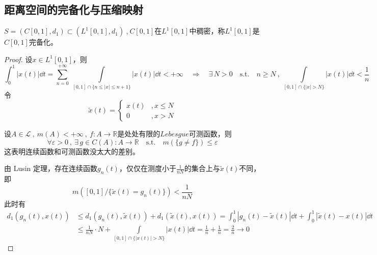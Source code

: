 \subsection{距离空间的完备化与压缩映射} \label{zip}
\begin{example}\label{example:l1complete}
\quad $S=(C[0,1],d_1) \subset (L^1[0,1],d_1) \ $,$ \ C[0,1]$在$L^1[0,1]$中稠密，称$L^1[0,1]$是$C[0,1]$完备化。
\end{example}
\begin{proof}
设$x \in L^1[0,1]$，则
\[\int_0^1|x(t)|\dd t=\sum_{n=0}^{+\infty} \ \int\limits_{[0,1]\cap\{n \leq |x| \leq n+1\}}|x(t)|\dd t<+\infty \quad \Rightarrow \quad \exists \, N>0 \quad \text{s.t.} \quad n \geq N \ , \ \int\limits_{[0,1]\cap\{|x|>N\}}|x(t)|\dd t<\frac{1}{n}\]
令
\[\tilde{x}(t)=\left \{
\begin{array}{ll}
    x(t) & , x \leq N \\ 0 & , x>N
\end{array}    
\right .\]
\begin{theorem}[Lusin 定理]\label{theorem:lusin}
设$A \in \mathscr{L} \ , \ m(A)<+\infty \ , \ f:A \to \mathbb{R}$是处处有限的$Lebesgue$可测函数，则
\[\forall \varepsilon>0 \ , \ \exists \, g \in C(A):A\to \mathbb{R} \quad \text{s.t.} \quad m(\{g \neq f\}) \leq \varepsilon\]
这表明连续函数和可测函数没太大的差别。
\end{theorem}
由 Lusin 定理，存在连续函数$g_n(t)$，仅仅在测度小于$\frac{1}{nN}$的集合上与$\tilde{x}(t)$不同，即
\[m([0,1]/\{\tilde{x}(t)=g_n(t)\})<\frac{1}{nN}\]
此时有
\begin{equation*}
    \begin{aligned}
        d_1(g_n(t),x(t)) & \leq d_1(g_n(t),\tilde{x}(t))+d_1(\tilde{x}(t),x(t))=\int_0^1|g_n(t)-\tilde{x}(t)|\dd t+\int_0^1|\tilde{x}(t)-x(t)|\dd t \\
        & \leq \frac{1}{nN} \cdot N+\int\limits_{[0,1]\cap\{|x(t)|>N\}}|x(t)|\dd t=\frac{1}{n}+\frac{1}{n}=\frac{2}{n} \to 0
    \end{aligned}
\end{equation*}
\end{proof}

